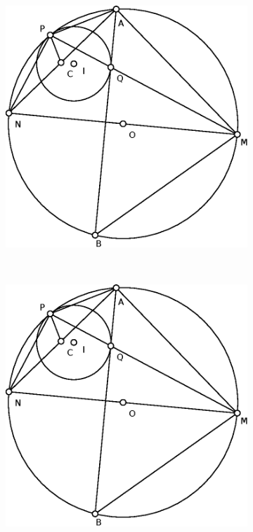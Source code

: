 \documentclass{article}
\begin{document}
\begin{enumerate}
    \begin{figure}[!ht]
    \centering
    \begin{subfigure}[b]{0.45\textwidth}
    \includegraphics[width=\textwidth]{China2012.eps}
    \caption{}\label{fig:p4}
    \end{subfigure}~
    \begin{subfigure}[b]{0.45\textwidth}
    \includegraphics[width=\textwidth]{China2012.eps}
    \caption{}
    \end{subfigure}
    \caption{}
    \end{figure}



\end{enumerate}
\end{document}
